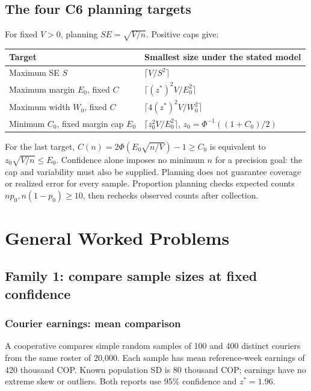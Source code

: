 \subsection{The four C6 planning targets}
For fixed $V>0$, planning $SE=\sqrt{V/n}$. Positive caps give:
\begin{center}\begin{tabular}{@{}ll@{}}\toprule
Target & Smallest size under the stated model\\\midrule
Maximum SE $S$ & $\lceil V/S^2\rceil$\\
Maximum margin $E_0$, fixed $C$ & $\lceil (z^*)^2V/E_0^2\rceil$\\
Maximum width $W_0$, fixed $C$ & $\lceil 4(z^*)^2V/W_0^2\rceil$\\
Minimum $C_0$, fixed margin cap $E_0$ & $\lceil z_0^2V/E_0^2\rceil$, $z_0=\Phi^{-1}((1+C_0)/2)$\\\bottomrule
\end{tabular}\end{center}
For the last target, $C(n)=2\Phi(E_0\sqrt{n/V})-1\ge C_0$ is equivalent to $z_0\sqrt{V/n}\le E_0$. Confidence alone imposes no minimum $n$ for a precision goal: the cap and variability must also be supplied. Planning does not guarantee coverage or realized error for every sample. Proportion planning checks expected counts $np_0,n(1-p_0)\ge10$, then rechecks observed counts after collection.
\clearpage
\section{General Worked Problems}\label{sec:worked-solution-examples}
\subsection{Family 1: compare sample sizes at fixed confidence}\label{sec:family-one}
\medskip
\subsubsection{Courier earnings: mean comparison}\label{prob:c7-mean-size}
A cooperative compares simple random samples of 100 and 400 distinct couriers from the same roster of 20,000. Each sample has mean reference-week earnings of 420 thousand COP. Known population SD is 80 thousand COP; earnings have no extreme skew or outliers. Both reports use 95\% confidence and $z^*=1.96$.
